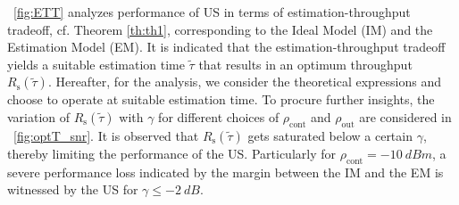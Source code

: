 \documentclass[12pt, draftclsnofoot, onecolumn]{IEEEtran}
\newcommand{\sub}[1]{_{\text{#1}}}
\newcommand{\opc}{\rho\sub{out}}
\newcommand{\pc}{\rho\sub{cont}}
\newcommand{\trs}{R\sub{s}}
\newcommand{\ttau}{\tilde{\tau}}
\begin{document}
\figurename~\ref{fig:ETT} analyzes performance of US in terms of estimation-throughput tradeoff, cf. Theorem \ref{th:th1}, corresponding to the Ideal Model (IM) and the Estimation Model (EM). %
It is indicated that the estimation-throughput tradeoff yields a suitable estimation time $\ttau$ that results in an optimum throughput $\trs(\ttau)$. Hereafter, for the analysis, we consider the theoretical expressions and choose to operate at suitable estimation time. To procure further insights, the variation of $\trs(\ttau)$ with $\gamma$ for different choices of $\pc$ and $\opc$ are considered in \figurename~\ref{fig:optT_snr}. It is observed that $\trs(\ttau)$ gets saturated below a certain $\gamma$, thereby limiting the performance of the US. Particularly for $\pc = \SI{-10}{dBm}$, a severe performance loss indicated by the margin between the IM and the EM is witnessed by the US for $\gamma \le \SI{-2}{dB}$. 
\end{document}
